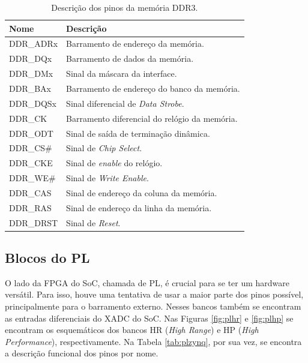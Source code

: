 \begin{table}[H]
	\ABNTEXfontereduzida
	\caption{\label{tab:psddr}Descrição dos pinos da memória DDR3.}
    \centering
    \begin{tabular}{@{} >{\centering}p{4cm} >{\centering}p{8cm} @{}}
    
		\toprule
		\textbf{Nome} & \textbf{Descrição} \tabularnewline 
        \midrule
         DDR\_ADRx & Barramento de endereço da memória. \tabularnewline
        \midrule
         DDR\_DQx & Barramento de dados da memória. \tabularnewline
        \midrule
         DDR\_DMx & Sinal da máscara da interface. \tabularnewline
        \midrule
        DDR\_BAx  & Barramento de endereço do banco da memória. \tabularnewline
        \midrule
        DDR\_DQSx  & Sinal diferencial de \textit{Data Strobe}. \tabularnewline
        \midrule
        DDR\_CK & Barramento diferencial do relógio da memória. \tabularnewline
        \midrule
        DDR\_ODT & Sinal de saída de terminação dinâmica. \tabularnewline
        \midrule
        DDR\_CS\# & Sinal de \textit{Chip Select}. \tabularnewline
        \midrule
        DDR\_CKE & Sinal de \textit{enable} do relógio. \tabularnewline
        \midrule
        DDR\_WE\# & Sinal de \textit{Write Enable}. \tabularnewline
        \midrule
        DDR\_CAS & Sinal de endereço da coluna da memória. \tabularnewline
         \midrule
        DDR\_RAS & Sinal de endereço da linha da memória. \tabularnewline
        \midrule
        DDR\_DRST & Sinal de \textit{Reset}. \tabularnewline
        \bottomrule
	\end{tabular}
\end{table}

\subsection{Blocos do PL}

O lado da FPGA do SoC, chamada de PL, é crucial para se ter um hardware versátil. Para isso, houve uma tentativa de usar a maior parte dos pinos possível, principalmente para o barramento externo. Nesses bancos também se encontram as entradas diferenciais do XADC do SoC. Nas Figuras \ref{fig:plhr} e \ref{fig:plhp} se encontram os esquemáticos dos bancos HR (\textit{High Range}) e HP (\textit{High Performance}), respectivamente. Na Tabela \ref{tab:plzynq}, por sua vez, se encontra a descrição funcional dos pinos por nome.

